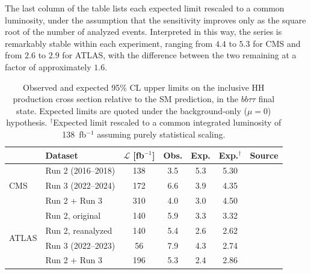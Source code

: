 The last column of the table lists each expected limit rescaled to a common luminosity, under the assumption that the sensitivity improves only as the square root of the number of analyzed events. Interpreted in this way, the series is remarkably stable within each experiment, ranging from $4.4$ to $5.3$ for CMS and from $2.6$ to $2.9$ for ATLAS, with the difference between the two remaining at a factor of approximately $1.6$.
%
\begin{table}[t]
\centering
\begin{tabular}{llccccl}
\toprule
 & Dataset & $\mathcal{L}$ [fb$^{-1}$] & Obs. & Exp. & Exp.$^{\dagger}$ & Source \\
\midrule
\multirow{3}{*}{CMS}
  & Run 2 (2016--2018)         & 138 & 3.5 & 5.3 & 5.30 & \cite{CMS-PAS-HIG-25-008} \\
  & Run 3 (2022--2024)         & 172 & 6.6 & 3.9 & 4.35 & \cite{CMS-PAS-HIG-25-008} \\
  & Run 2 + Run 3              & 310 & 4.0 & 3.0 & 4.50 & \cite{CMS-PAS-HIG-25-008} \\
\midrule
\multirow{4}{*}{ATLAS}
  & Run 2, original            & 140 & 5.9 & 3.3 & 3.32 & \cite{ATLAS-HH-bbtautau-Run2} \\
  & Run 2, reanalyzed          & 140 & 5.4 & 2.6 & 2.62 & \cite{ATLAS-HH-bbtautau-Run3} \\
  & Run 3 (2022--2023)         &  56 & 7.9 & 4.3 & 2.74 & \cite{ATLAS-HH-bbtautau-Run3} \\
  & Run 2 + Run 3              & 196 & 5.3 & 2.4 & 2.86 & \cite{ATLAS-HH-bbtautau-Run3} \\
\bottomrule
\end{tabular}
\caption[Comparison of CMS and ATLAS upper limits in $HH\to bb\tau\tau$]{%
Observed and expected 95\% CL upper limits on the inclusive HH production cross
section relative to the SM prediction, in the $bb\tau\tau$ final state. Expected
limits are quoted under the background-only ($\mu = 0$) hypothesis.
$^{\dagger}$Expected limit rescaled to a common integrated luminosity of
138~fb$^{-1}$ assuming purely statistical scaling.}
\label{tab:hh_bbtautau_limits}
\end{table}
%

